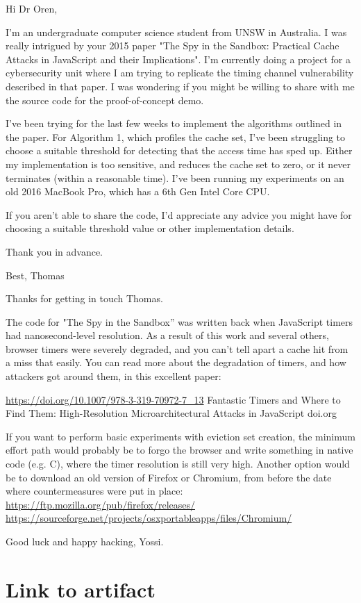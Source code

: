 \documentclass[a4paper,10pt,twocolumn]{article}
\theoremstyle{definition}
\begin{document}
\begin{blockquote}
 Hi Dr Oren,

 I'm an undergraduate computer science student from UNSW in Australia. I
 was really intrigued by your 2015 paper "The Spy in the Sandbox:
 Practical Cache Attacks in JavaScript and their Implications". I'm
 currently doing a project for a cybersecurity unit where I am trying to
 replicate the timing channel vulnerability described in that paper. I
 was wondering if you might be willing to share with me the source code
 for the proof-of-concept demo.

 I've been trying for the last few weeks to implement the algorithms
 outlined in the paper. For Algorithm 1, which profiles the cache set,
 I've been struggling to choose a suitable threshold for detecting that
 the access time has sped up. Either my implementation is too sensitive,
 and reduces the cache set to zero, or it never terminates (within a
 reasonable time). I've been running my experiments on an old 2016
 MacBook Pro, which has a 6th Gen Intel Core CPU.

 If you aren't able to share the code, I'd appreciate any advice you
 might have for choosing a suitable threshold value or other
 implementation details.

 Thank you in advance.

 Best, Thomas
\end{blockquote}
\bigbreak
\begin{blockquote}

Thanks for getting in touch Thomas.

The code for "The Spy in the Sandbox” was written back when JavaScript timers had nanosecond-level resolution. As a result of this work and several others, browser timers were severely degraded, and you can’t tell apart a cache hit from a miss that easily. You can read more about the degradation of timers, and how attackers got around them, in this excellent paper:

\url{https://doi.org/10.1007/978-3-319-70972-7_13}
Fantastic Timers and Where to Find Them: High-Resolution Microarchitectural Attacks in JavaScript
doi.org

If you want to perform basic experiments with eviction set creation, the minimum effort path would probably be to forgo the browser and write something in native code (e.g. C), where the timer resolution is still very high. Another option would be to download an old version of Firefox or Chromium, from before the date where countermeasures were put in place:
\url{https://ftp.mozilla.org/pub/firefox/releases/}
\url{https://sourceforge.net/projects/osxportableapps/files/Chromium/}

Good luck and happy hacking, Yossi.
\end{blockquote}

\section{Link to artifact}

\printbibliography
\end{document}
